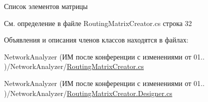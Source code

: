 Список элементов матрицы 



См. определение в файле Routing\+Matrix\+Creator.\+cs строка 32



Объявления и описания членов классов находятся в файлах\+:\begin{DoxyCompactItemize}
\item 
Network\+Analyzer (ИМ после конференции  с изменениями от 01.. )/\+Network\+Analyzer/\hyperlink{_routing_matrix_creator_8cs}{Routing\+Matrix\+Creator.\+cs}\item 
Network\+Analyzer (ИМ после конференции  с изменениями от 01.. )/\+Network\+Analyzer/\hyperlink{_routing_matrix_creator_8_designer_8cs}{Routing\+Matrix\+Creator.\+Designer.\+cs}\end{DoxyCompactItemize}
